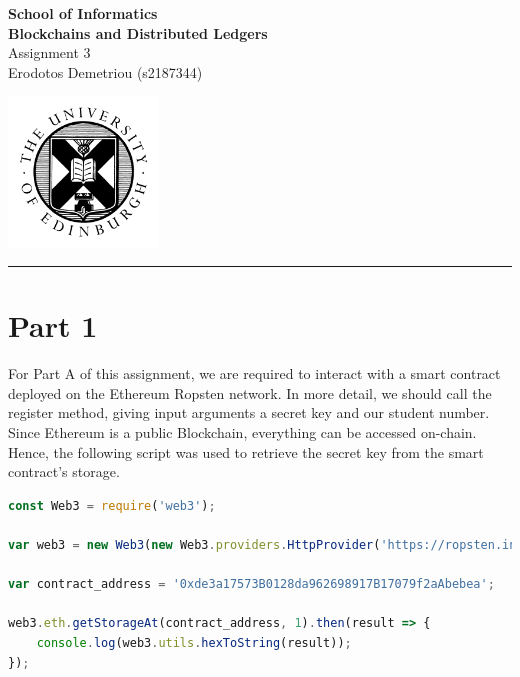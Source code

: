 \documentclass[12pt,a4paper]{article}
\begin{document}
\noindent
\begin{minipage}{120mm}
        {\huge {\bf School of Informatics}}\\
        {\Large {\bf Blockchains and Distributed Ledgers}}\\

        {\Large Assignment 3}\\
        {\normalsize Erodotos Demetriou (s2187344)}
\end{minipage}
\hfill
\begin{minipage}{40mm}              
        \includegraphics[width=40mm]{crest.png}
\end{minipage}

\begin{center}
\rule{\linewidth}{0.5mm}
\end{center}

\section*{Part 1}

For Part A of this assignment, we are required to interact with a smart contract
deployed on the Ethereum Ropsten network. In more detail, we should call the
register method, giving input arguments a secret key and our student number.
Since Ethereum is a public Blockchain, everything can be accessed on-chain.
Hence, the following script was used to retrieve the secret key from the smart
contract's storage. \\

\begin{lstlisting}[language=JavaScript]
const Web3 = require('web3');

var web3 = new Web3(new Web3.providers.HttpProvider('https://ropsten.infura.io/v3/0ab1814012ad4231965d67bf98a40b1a'));

var contract_address = '0xde3a17573B0128da962698917B17079f2aAbebea';

web3.eth.getStorageAt(contract_address, 1).then(result => {
    console.log(web3.utils.hexToString(result));
});
\end{lstlisting} 
\end{document}
